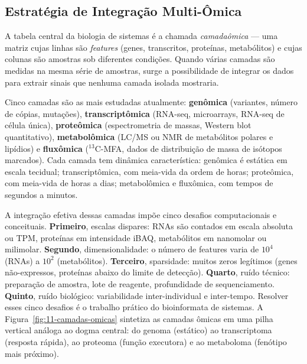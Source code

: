 \subsection{Estratégia de Integração Multi-Ômica}
\label{sub:image11-estrategia}

A tabela central da biologia de sistemas é a chamada \emph{camadaômica} ---
uma matriz cujas linhas são \emph{features} (genes, transcritos, proteínas,
metabólitos) e cujas colunas são amostras sob diferentes condições. Quando
várias camadas são medidas na mesma série de amostras, surge a possibilidade
de integrar os dados para extrair sinais que nenhuma camada isolada mostraria.

Cinco camadas são as mais estudadas atualmente: \textbf{genômica} (variantes,
número de cópias, mutações), \textbf{transcriptômica} (RNA-seq, microarrays,
RNA-seq de célula única), \textbf{proteômica} (espectrometria de massas,
Western blot quantitativo), \textbf{metabolômica} (LC/MS ou NMR de metabólitos
polares e lipídios) e \textbf{fluxômica} ($^{13}$C-MFA, dados de distribuição
de massa de isótopos marcados). Cada camada tem dinâmica característica:
genômica é estática em escala tecidual; transcriptômica, com meia-vida da
ordem de horas; proteômica, com meia-vida de horas a dias; metabolômica e
fluxômica, com tempos de segundos a minutos.

A integração efetiva dessas camadas impõe cinco desafios computacionais e
conceituais. \textbf{Primeiro}, escalas dispares: RNAs são contados em
escala absoluta ou TPM, proteínas em intensidade iBAQ, metabólitos em
nanomolar ou milimolar. \textbf{Segundo}, dimensionalidade: o número de
features varia de $10^4$ (RNAs) a $10^2$ (metabólitos). \textbf{Terceiro},
sparsidade: muitos zeros legítimos (genes não-expressos, proteínas abaixo do
limite de detecção). \textbf{Quarto}, ruído técnico: preparação de amostra,
lote de reagente, profundidade de sequenciamento. \textbf{Quinto}, ruído
biológico: variabilidade inter-individual e inter-tempo. Resolver esses cinco
desafios é o trabalho prático do bioinformata de sistemas. A
Figura~\ref{fig:11-camadas-omicas} sintetiza as camadas ômicas em uma
pilha vertical análoga ao dogma central: do genoma (estático) ao
transcriptoma (resposta rápida), ao proteoma (função executora) e ao
metaboloma (fenótipo mais próximo).

